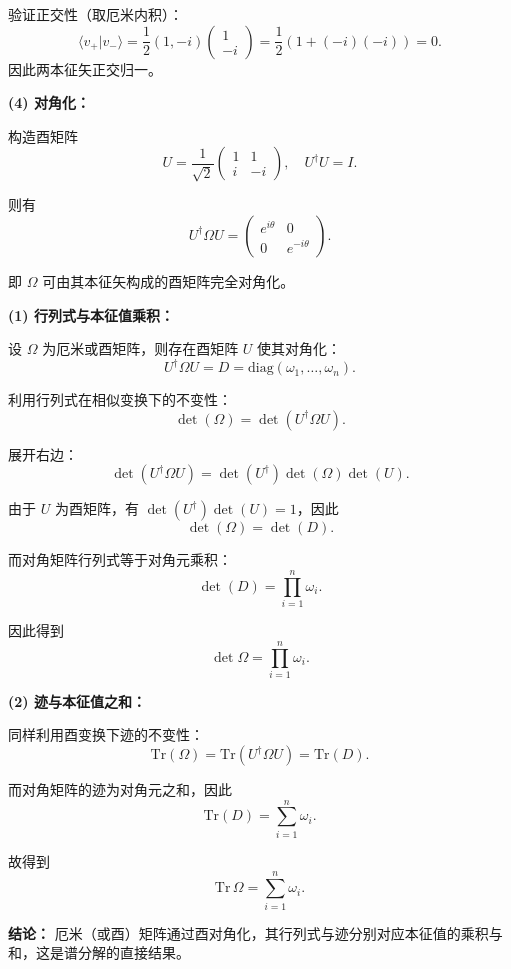 \begin{solution}[二维旋转矩阵的酉对角化]
验证正交性（取厄米内积）：
\[
\langle v_+|v_-\rangle
=
\frac{1}{2}(1,-i)\begin{pmatrix}1\\-i\end{pmatrix}
=
\frac{1}{2}(1+(-i)(-i))=0.
\]
因此两本征矢正交归一。

\vspace{0.5em}
\textbf{(4) 对角化：}

构造酉矩阵
\[
U=\frac{1}{\sqrt{2}}
\begin{pmatrix}
1 & 1\\
i & -i
\end{pmatrix},
\quad
U^\dagger U=I.
\]

则有
\[
U^\dagger \Omega U
=
\begin{pmatrix}
e^{i\theta} & 0\\
0 & e^{-i\theta}
\end{pmatrix}.
\]

即 $\Omega$ 可由其本征矢构成的酉矩阵完全对角化。
\end{solution}


\begin{solution}[行列式与迹在相似变换下的不变性]
\answer

\vspace{0.3em}
\textbf{(1) 行列式与本征值乘积：}

设 $\Omega$ 为厄米或酉矩阵，则存在酉矩阵 $U$ 使其对角化：
\[
U^\dagger \Omega U = D = \mathrm{diag}(\omega_1,\dots,\omega_n).
\]

利用行列式在相似变换下的不变性：
\[
\det(\Omega)=\det(U^\dagger \Omega U).
\]

展开右边：
\[
\det(U^\dagger \Omega U)=\det(U^\dagger)\det(\Omega)\det(U).
\]

由于 $U$ 为酉矩阵，有 $\det(U^\dagger)\det(U)=1$，因此
\[
\det(\Omega)=\det(D).
\]

而对角矩阵行列式等于对角元乘积：
\[
\det(D)=\prod_{i=1}^n \omega_i.
\]

因此得到
\[
\det \Omega = \prod_{i=1}^n \omega_i.
\]

\vspace{0.5em}
\textbf{(2) 迹与本征值之和：}

同样利用酉变换下迹的不变性：
\[
\mathrm{Tr}(\Omega)=\mathrm{Tr}(U^\dagger \Omega U)=\mathrm{Tr}(D).
\]

而对角矩阵的迹为对角元之和，因此
\[
\mathrm{Tr}(D)=\sum_{i=1}^n \omega_i.
\]

故得到
\[
\mathrm{Tr}\,\Omega = \sum_{i=1}^n \omega_i.
\]

\vspace{0.3em}
\textbf{结论：}
厄米（或酉）矩阵通过酉对角化，其行列式与迹分别对应本征值的乘积与和，这是谱分解的直接结果。
\end{solution}



